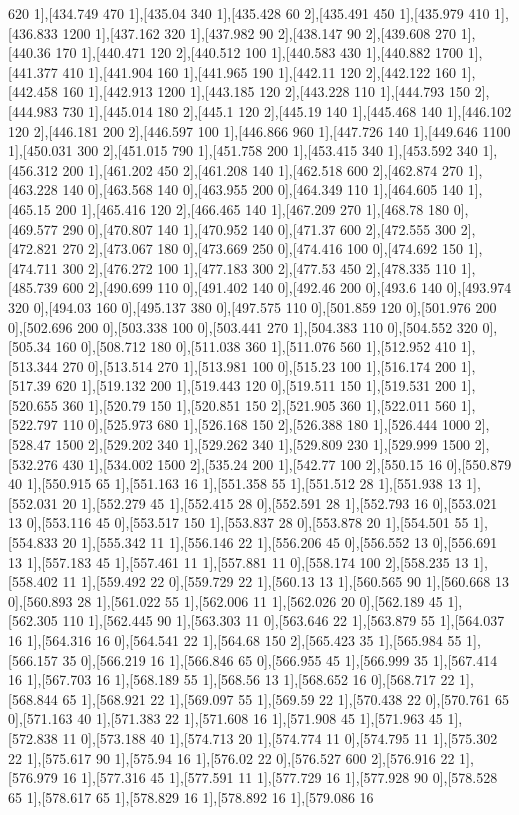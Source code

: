 {620 1],[434.749 470 1],[435.04 340 1],[435.428 60 2],[435.491 450 1],[435.979 410 1],[436.833 1200 1],[437.162 320 1],[437.982 90 2],[438.147 90 2],[439.608 270 1],[440.36 170 1],[440.471 120 2],[440.512 100 1],[440.583 430 1],[440.882 1700 1],[441.377 410 1],[441.904 160 1],[441.965 190 1],[442.11 120 2],[442.122 160 1],[442.458 160 1],[442.913 1200 1],[443.185 120 2],[443.228 110 1],[444.793 150 2],[444.983 730 1],[445.014 180 2],[445.1 120 2],[445.19 140 1],[445.468 140 1],[446.102 120 2],[446.181 200 2],[446.597 100 1],[446.866 960 1],[447.726 140 1],[449.646 1100 1],[450.031 300 2],[451.015 790 1],[451.758 200 1],[453.415 340 1],[453.592 340 1],[456.312 200 1],[461.202 450 2],[461.208 140 1],[462.518 600 2],[462.874 270 1],[463.228 140 0],[463.568 140 0],[463.955 200 0],[464.349 110 1],[464.605 140 1],[465.15 200 1],[465.416 120 2],[466.465 140 1],[467.209 270 1],[468.78 180 0],[469.577 290 0],[470.807 140 1],[470.952 140 0],[471.37 600 2],[472.555 300 2],[472.821 270 2],[473.067 180 0],[473.669 250 0],[474.416 100 0],[474.692 150 1],[474.711 300 2],[476.272 100 1],[477.183 300 2],[477.53 450 2],[478.335 110 1],[485.739 600 2],[490.699 110 0],[491.402 140 0],[492.46 200 0],[493.6 140 0],[493.974 320 0],[494.03 160 0],[495.137 380 0],[497.575 110 0],[501.859 120 0],[501.976 200 0],[502.696 200 0],[503.338 100 0],[503.441 270 1],[504.383 110 0],[504.552 320 0],[505.34 160 0],[508.712 180 0],[511.038 360 1],[511.076 560 1],[512.952 410 1],[513.344 270 0],[513.514 270 1],[513.981 100 0],[515.23 100 1],[516.174 200 1],[517.39 620 1],[519.132 200 1],[519.443 120 0],[519.511 150 1],[519.531 200 1],[520.655 360 1],[520.79 150 1],[520.851 150 2],[521.905 360 1],[522.011 560 1],[522.797 110 0],[525.973 680 1],[526.168 150 2],[526.388 180 1],[526.444 1000 2],[528.47 1500 2],[529.202 340 1],[529.262 340 1],[529.809 230 1],[529.999 1500 2],[532.276 430 1],[534.002 1500 2],[535.24 200 1],[542.77 100 2],[550.15 16 0],[550.879 40 1],[550.915 65 1],[551.163 16 1],[551.358 55 1],[551.512 28 1],[551.938 13 1],[552.031 20 1],[552.279 45 1],[552.415 28 0],[552.591 28 1],[552.793 16 0],[553.021 13 0],[553.116 45 0],[553.517 150 1],[553.837 28 0],[553.878 20 1],[554.501 55 1],[554.833 20 1],[555.342 11 1],[556.146 22 1],[556.206 45 0],[556.552 13 0],[556.691 13 1],[557.183 45 1],[557.461 11 1],[557.881 11 0],[558.174 100 2],[558.235 13 1],[558.402 11 1],[559.492 22 0],[559.729 22 1],[560.13 13 1],[560.565 90 1],[560.668 13 0],[560.893 28 1],[561.022 55 1],[562.006 11 1],[562.026 20 0],[562.189 45 1],[562.305 110 1],[562.445 90 1],[563.303 11 0],[563.646 22 1],[563.879 55 1],[564.037 16 1],[564.316 16 0],[564.541 22 1],[564.68 150 2],[565.423 35 1],[565.984 55 1],[566.157 35 0],[566.219 16 1],[566.846 65 0],[566.955 45 1],[566.999 35 1],[567.414 16 1],[567.703 16 1],[568.189 55 1],[568.56 13 1],[568.652 16 0],[568.717 22 1],[568.844 65 1],[568.921 22 1],[569.097 55 1],[569.59 22 1],[570.438 22 0],[570.761 65 0],[571.163 40 1],[571.383 22 1],[571.608 16 1],[571.908 45 1],[571.963 45 1],[572.838 11 0],[573.188 40 1],[574.713 20 1],[574.774 11 0],[574.795 11 1],[575.302 22 1],[575.617 90 1],[575.94 16 1],[576.02 22 0],[576.527 600 2],[576.916 22 1],[576.979 16 1],[577.316 45 1],[577.591 11 1],[577.729 16 1],[577.928 90 0],[578.528 65 1],[578.617 65 1],[578.829 16 1],[578.892 16 1],[579.086 16 }
